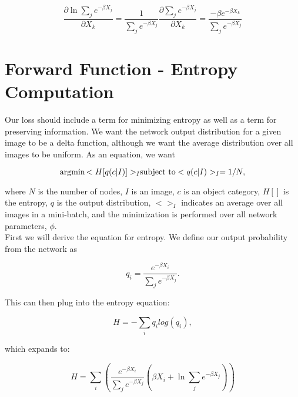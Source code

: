 \begin{equation}
    \frac{\partial \ln{\sum_{j} e^{-\beta X_{j}}}}{\partial X_{k}} = \frac{1}{\sum_{j} e^{-\beta X_{j}}} \frac{\partial \sum_{j} e^{-\beta X_{j}}}{\partial X_{k}} = \frac{-\beta e^{-\beta X_{k}}}{\sum_{j}e^{-\beta X_{j}}}
\label{dlne}
\end{equation}

\section{Forward Function - Entropy Computation} \label{forward}
\noindent Our loss should include a term for minimizing entropy as well as a term for preserving information. We want the network output distribution for a given image to be a delta function, although we want the average distribution over all images to be uniform. As an equation, we want 

\begin{displaymath}
\argmin{<H[q(c|I)]>_{I}} \\
\text{subject to} <q(c|I)>_{I} = 1/N,
\end{displaymath}

\noindent where $N$ is the number of nodes, $I$ is an image, $c$ is an object category, $H[]$ is the entropy, $q$ is the output distribution, $<>_{I}$ indicates an average over all images in a mini-batch, and the minimization is performed over all network parameters, $\phi$.\\

\noindent First we will derive the equation for entropy. We define our output probability from the network as

\begin{equation}
    q_i = \frac{e^{-\beta X_{i}}}{\sum_{j} e^{-\beta X_{j}}}.
\label{qdef}
\end{equation}

\noindent This can then plug into the entropy equation:

\begin{equation}
    H = -\sum_{i} q_{i} log(q_{i}),
\label{entropy}
\end{equation}

\noindent which expands to:

\begin{displaymath}
    H = \sum_{i}\left( \frac{e^{-\beta X_{i}}}{\sum_{j} e^{-\beta X_{j}}} \left(\beta X_{i} + \ln{\sum_{j}e^{-\beta X_{j}}}\right)\right)
\label{entropyexp}
\end{displaymath}

